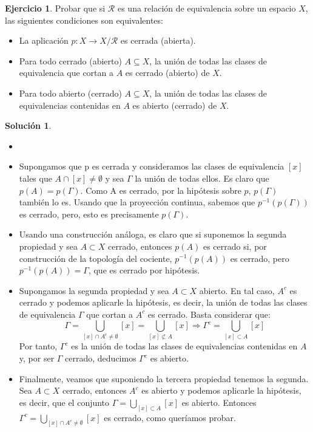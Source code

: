 \documentclass{article}
\theoremstyle{plain}
\theoremstyle{definition}
\newtheorem{exercise}{Ejercicio}
\newtheorem*{sol*}{Solución}
\begin{document}
\newpage
\begin{exercise}
Probar que si $\mathcal{R}$ es una relación de equivalencia sobre un espacio $X$, las siguientes condiciones son equivalentes:
\begin{itemize}
	\item La aplicación $p : X \to X/\mathcal{R}$ es cerrada (abierta).
	\item Para todo cerrado (abierto) $A \subseteq X$, la unión de todas las clases de equivalencia que cortan a $A$ es cerrado (abierto) de $X$.
	\item Para todo abierto (cerrado) $A \subseteq X$, la unión de todas las clases de equivalencias contenidas en $A$ es abierto (cerrado) de $X$.
\end{itemize}
\end{exercise}
\begin{sol*}
\begin{itemize}
\item[]
\item Supongamos que p es cerrada y consideramos las clases de equivalencia $[x]$ tales que $A\cap[x]\neq \emptyset$ y sea $\Gamma$ la unión de todas ellos. Es claro que $p(A) = p(\Gamma)$. Como A es cerrado, por la hipótesis sobre $p$, $p(\Gamma)$ también lo es. Usando que la proyección continua, sabemos que $p^{-1}(p(\Gamma))$ es cerrado, pero, esto es precisamente $p(\Gamma)$.
\item Usando una construcción análoga, es claro que si suponemos la segunda propiedad y sea $A \subset X$ cerrado, entonces $p(A)$ es cerrado si, por construcción de la topología del cociente, $p^{-1}(p(A))$ es cerrado, pero $p^{-1}(p(A)) = \Gamma$, que es cerrado por hipótesis.
\item Supongamos la segunda propiedad y sea $A \subset X$ abierto. En tal caso, $A^c$ es cerrado y podemos aplicarle la hipótesis, es decir, la unión de todas las clases de equivalencia $\Gamma$ que cortan a $A^c$ es cerrado. Basta considerar que:
\[
\Gamma = \bigcup_{[x]\cap A^c \neq \emptyset} [x]  = \bigcup_{[x]\not\subset A} [x] \Rightarrow \Gamma^c = \bigcup_{[x]\subset A} [x]
\]
Por tanto, $\Gamma^c$ es la unión de todas las clases de equivalencias contenidas en $A$ y, por ser $\Gamma$ cerrado, deducimos $\Gamma^c$ es abierto.
\item Finalmente, veamos que suponiendo la tercera propiedad tenemos la segunda. Sea $A\subset X$ cerrado, entonces $A^c$ es abierto y podemos aplicarle la hipótesis, es decir, que el conjunto $\Gamma = \bigcup_{[x]\subset A}[x]$ es abierto. Entonces $\Gamma^c = \bigcup_{[x]\cap A^c \neq \emptyset} [x]$ es cerrado, como queríamos probar.
\end{itemize}
\end{sol*}
\end{document}
